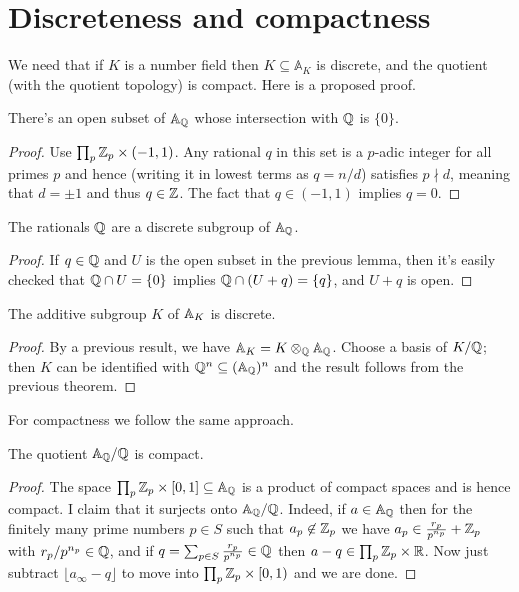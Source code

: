 \section{Discreteness and compactness}

We need that if $K$ is a number field then
$K\subseteq\mathbb{A}_K$ is discrete, and the quotient (with the
quotient topology) is compact. Here is a proposed proof.

\begin{theorem}
  \label{Rat.AdeleRing.zero_discrete}
  \leanok
  There's an open subset of $\mathbb{A}_{\mathbb{Q}}$ whose intersection with $\mathbb{Q}$ is $\{0\}$.
\end{theorem}
\begin{proof}
  Use $\prod_p{\mathbb{Z}_p}\times(-1,1)$. Any rational $q$ in this set is a $p$-adic
  integer for all primes $p$ and hence (writing it in lowest terms as $q=n/d$)
  satisfies $p\nmid d$, meaning that $d=\pm1$ and thus $q\in\mathbb{Z}$. The fact
  that $q\in(-1,1)$ implies $q=0$.
\end{proof}

\begin{theorem}
  \label{Rat.AdeleRing.discrete}
  \leanok
  The rationals $\mathbb{Q}$ are a discrete subgroup of $\mathbb{A}_{\mathbb{Q}}$.
\end{theorem}
\begin{proof}
  If $q\in\mathbb{Q}$ and $U$ is the open subset in the previous lemma, then
  it's easily checked that $\mathbb{Q}\cap U=\{0\}$ implies $\mathbb{Q}\cap (U+q)=\{q\}$,
  and $U+q$ is open.
\end{proof}

\begin{theorem}
  \label{NumberField.AdeleRing.discrete}
  \leanok
  The additive subgroup $K$ of $\mathbb{A}_K$ is discrete.
\end{theorem}
\begin{proof}
  By a previous result, we have $\mathbb{A}_K=K\otimes_{\mathbb{Q}}\mathbb{A}_{\mathbb{Q}}$.
  Choose a basis of $K/\mathbb{Q}$; then $K$ can be identified with $\mathbb{Q}^n\subseteq(\mathbb{A}_{\mathbb{Q}})^n$
  and the result follows from the previous theorem.
\end{proof}

For compactness we follow the same approach.

\begin{theorem}
  \label{Rat.AdeleRing.cocompact}
  \leanok
  The quotient $\mathbb{A}_{\mathbb{Q}}/\mathbb{Q}$ is compact.
\end{theorem}
\begin{proof}
  The space $\prod_p\mathbb{Z}_p\times[0,1]\subseteq\mathbb{A}_{\mathbb{Q}}$ is a product of compact spaces
  and is hence compact. I claim that it surjects onto $\mathbb{A}_{\mathbb{Q}}/\mathbb{Q}$. Indeed,
  if $a\in\mathbb{A}_{\mathbb{Q}}$ then for the finitely many prime numbers $p\in S$ such that $a_p\not\in\mathbb{Z}_p$
  we have $a_p\in\frac{r_p}{p^{n_p}}+\mathbb{Z}_p$ with $r_p/p^{n_p}\in\mathbb{Q}$, and
  if $q=\sum_{p\in S}\frac{r_p}{p^{n_p}}\in\mathbb{Q}$ then $a-q\in \prod_p\mathbb{Z}_p\times\mathbb{R}$.
  Now just subtract $\lfloor a_{\infty}-q\rfloor$ to move into $\prod_p\mathbb{Z}_p\times[0,1)$
  and we are done.
\end{proof}

